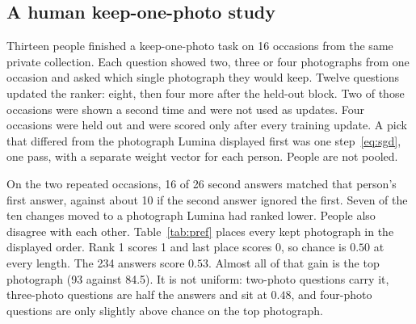 \documentclass[conference]{IEEEtran}
\begin{document}
\subsection{A human keep-one-photo study}
\label{sec:pref-eval}

Thirteen people finished a keep-one-photo task on 16 occasions from the same
private collection. Each question showed two, three or four photographs from
one occasion and asked which single photograph they would keep. Twelve
questions updated the ranker: eight, then four more after the held-out block.
Two of those occasions were shown a second time and were not used as updates.
Four occasions were held out and were scored only after every training update.
A pick that differed from the photograph Lumina displayed first was one
step~\eqref{eq:sgd}, one pass, with a separate weight vector for each person.
People are not pooled.

On the two repeated occasions, 16 of 26 second answers matched that person's
first answer, against about 10 if the second answer ignored the first. Seven
of the ten changes moved to a photograph Lumina had ranked lower. People also
disagree with each other. Table~\ref{tab:pref} places every kept photograph in
the displayed order. Rank 1 scores 1 and last place scores 0, so chance is
$0.50$ at every length. The 234 answers score $0.53$. Almost all of that gain
is the top photograph (93 against 84.5). It is not uniform: two-photo questions
carry it, three-photo questions are half the answers and sit at $0.48$, and
four-photo questions are only slightly above chance on the top photograph.

\begin{table}[t]
\caption{Where the kept photograph sits in Lumina's displayed order.
The $0$--$1$ score maps rank 1 to 1 and last place to 0. Chance is a uniform
pick among the photographs on that question. Lower mean rank is closer to the
photograph Lumina showed first. Thirteen finished sittings, 18 questions.}
\label{tab:pref}
\centering
\scriptsize
{}
\end{table}
\end{document}
